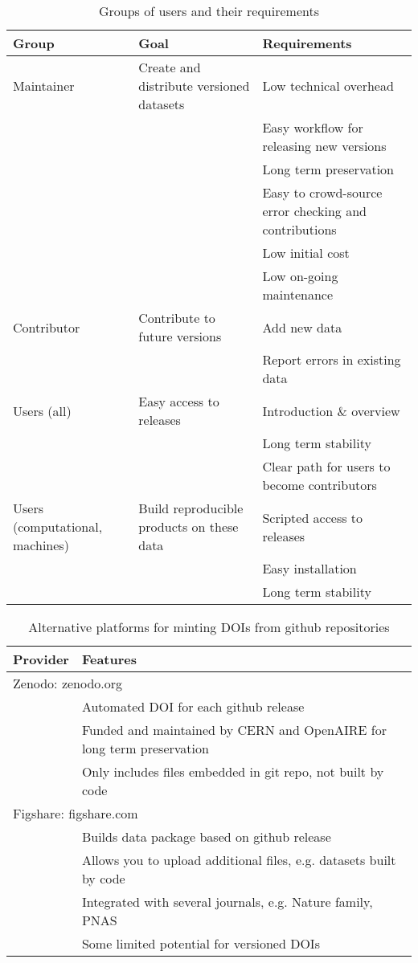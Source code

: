 \documentclass[a4paper,11pt]{article}
\begin{document}
\begin{table}[h!]
\centering
\caption{Groups of users and their requirements}
{\footnotesize
\vspace{1cm}
  \begin{tabular}{p{2cm}p{5cm}p{7cm}}
  \hline
  \textbf{Group} & \textbf{Goal} & \textbf{Requirements} \\ \hline
  Maintainer & Create and distribute versioned datasets & Low technical overhead \\
    & & Easy workflow for releasing new versions \\
    & & Long term preservation \\
    & & Easy to crowd-source error checking and contributions \\
    & & Low initial cost \\
    & & Low on-going maintenance \\
  Contributor & Contribute to future versions & Add new data \\
    & & Report errors in existing data  \\
  Users (all) & Easy access to releases & Introduction \& overview \\
    & & Long term stability \\
    & & Clear path for users to become contributors \\
  Users (computational, machines) & Build reproducible products on these data & Scripted access to releases\\
    & &Easy installation\\
    & & Long term stability \\
  \hline
  \end{tabular}
  }
\label{tab:user_requirements}
\end{table}

\newpage


\begin{table}[h!]
\centering
\caption{Alternative platforms for minting DOIs from github repositories}
{\footnotesize
\vspace{1cm}
  \begin{tabular}{p{3cm}p{8cm}}
  \hline
  \textbf{Provider} & \textbf{Features} \\ \hline
  \multicolumn{2}{l}{Zenodo: zenodo.org}\\
    & Automated DOI for each github release \\
    & Funded and maintained by CERN and OpenAIRE for long term preservation \\
    & Only includes files embedded in git repo, not built  by code\\
  \multicolumn{2}{l}{Figshare: figshare.com}\\
    & Builds data package based on github release \\
    & Allows you to upload additional files, e.g. datasets built by code \\
    & Integrated with several journals, e.g. Nature family, PNAS \\
    & Some limited potential for versioned DOIs\\
  \hline
  \end{tabular}
  }
\label{tab:doi_minting}
\end{table}
\end{document}
